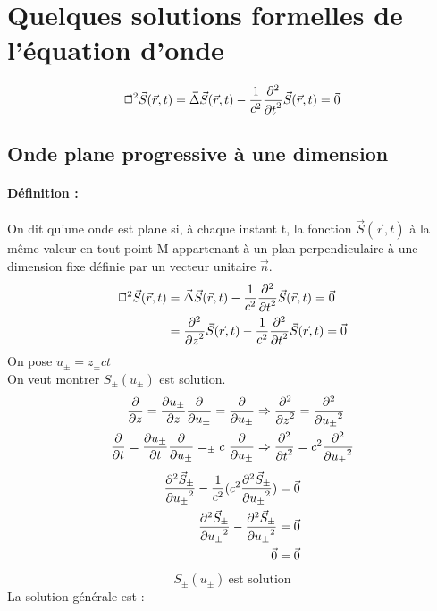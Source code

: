 \documentclass[11pt,a4paper,french]{article}
\begin{document}
\section{Quelques solutions formelles de l'équation d'onde}
$$\vec \Box^2 \vec S(\vec r, t) = \vec \Delta \vec S(\vec r, t) - {1 \over c^2}{\partial^2 \over {\partial t}^2} \vec S(\vec r, t) = \vec 0$$
\subsection{Onde plane progressive à une dimension}
\paragraph{Définition : }
On dit qu'une onde est plane si, à chaque instant t, la fonction $\vec S(\vec r, t)$ à la même valeur en tout point M appartenant à un plan perpendiculaire à une dimension fixe définie par un vecteur unitaire $\vec n$.
\begin{align*}
\vec \Box^2 \vec S(\vec r, t) &= \vec \Delta \vec S(\vec r, t) - {1 \over c^2}{\partial^2 \over {\partial t}^2} \vec S(\vec r, t) = \vec 0 \\
& = {\partial^2 \over {\partial z}^2} \vec S(\vec r, t) - {1 \over c^2}{\partial^2 \over {\partial t}^2} \vec S(\vec r, t) = \vec 0
\end{align*}
On pose $u_\pm = z _\pm ct$ \\
On veut montrer $S _\pm(u_\pm)$ est solution.
\begin{align*}
{\partial \over \partial z} = {\partial u_\pm \over \partial z}{\partial \over \partial u_\pm} = {\partial \over \partial u_\pm} &\Rightarrow {\partial^2 \over {\partial z}^2} = {\partial ^2 \over {\partial u_\pm}^2}\\
{\partial \over \partial t} = {\partial u_\pm \over \partial t}{\partial \over \partial u_\pm} = _\pm c~{\partial \over \partial u_\pm} &\Rightarrow {\partial^2 \over {\partial t}^2} = c^2 {\partial ^2 \over {\partial u_\pm}^2}
\end{align*}
\begin{align*}
{\partial^2 \vec S _\pm\over {\partial u _\pm}^2} - {1 \over c^2}(c^2 {\partial^2 \vec S _\pm \over {\partial u_\pm}^2}) &= \vec 0 \\
{\partial^2 \vec S_\pm\over {\partial u_\pm}^2} - {\partial ^2 \vec S_\pm\over {\partial u_\pm}^2} &= \vec 0\\
\vec 0 &= \vec 0
\end{align*}
$$S_\pm (u _\pm)~\text{est solution}$$
La solution générale est :
\end{document}
